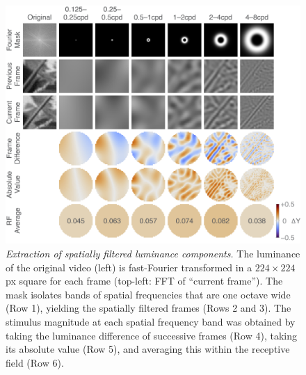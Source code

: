 \documentclass[english,a4paper]{article}
\begin{document}
\begin{figure}
\centering \includegraphics[width=\columnwidth]{fig4}
%
\caption{%
\textit{Extraction of spatially filtered luminance components.}
The luminance of the original video (left) is 
fast-Fourier transformed in a $224 \times 224$ px square for each frame (top-left: FFT of 
``current frame'').
The mask isolates bands of spatial frequencies that are one octave wide (Row 1), yielding 
the spatially filtered frames (Rows 2 and 3).
The stimulus magnitude at each spatial frequency band was obtained 
by taking the luminance difference of successive frames (Row 4), 
taking its absolute value (Row 5), 
and averaging this within the receptive field (Row 6).
}
%
\end{figure}
\end{document}
